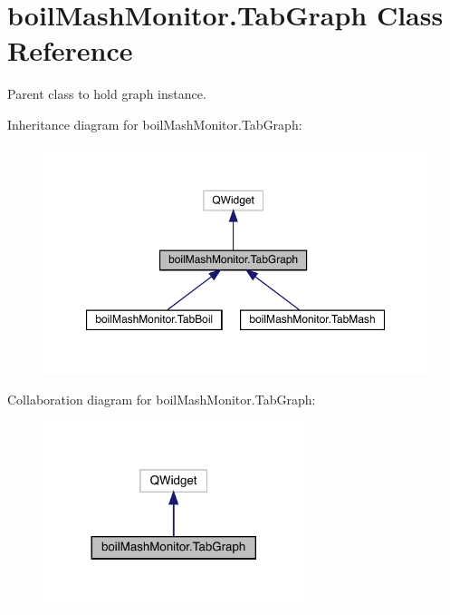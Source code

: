 \hypertarget{classboil_mash_monitor_1_1_tab_graph}{}\section{boil\+Mash\+Monitor.\+Tab\+Graph Class Reference}
\label{classboil_mash_monitor_1_1_tab_graph}


Parent class to hold graph instance.  




Inheritance diagram for boil\+Mash\+Monitor.\+Tab\+Graph\+:\nopagebreak
\begin{figure}[H]
\begin{center}
\leavevmode
\includegraphics[width=350pt]{classboil_mash_monitor_1_1_tab_graph__inherit__graph}
\end{center}
\end{figure}


Collaboration diagram for boil\+Mash\+Monitor.\+Tab\+Graph\+:\nopagebreak
\begin{figure}[H]
\begin{center}
\leavevmode
\includegraphics[width=216pt]{classboil_mash_monitor_1_1_tab_graph__coll__graph}
\end{center}
\end{figure}
